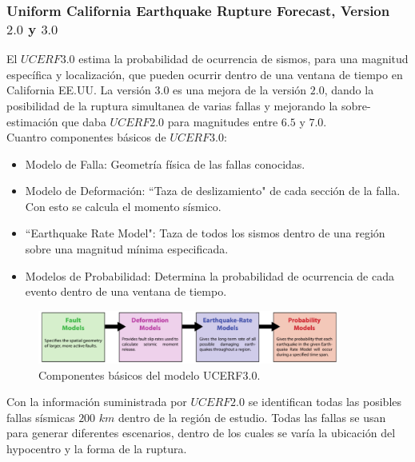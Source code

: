 %
%
\begin{frame}[allowframebreaks]
\frametitle{Uniform California Earthquake Rupture Forecast, Version $2.0$ y $3.0$}
%
\justifying
%
El $UCERF3.0$ estima la probabilidad de ocurrencia de sismos, para una magnitud específica y localización, que pueden ocurrir dentro de una ventana de tiempo en California EE.UU. La versión $3.0$ es una mejora de la versión $2.0$, dando la posibilidad de la ruptura simultanea de varias fallas y mejorando la sobre-estimación que daba $UCERF2.0$ para magnitudes entre $6.5$ y $7.0$.\\
%
Cuantro componentes básicos de $UCERF3.0$:
%
	\begin{itemize}
	\justifying
		\item Modelo de Falla: Geometría física de las fallas conocidas.
		\item Modelo de Deformación: ``Taza de deslizamiento" de cada sección de la falla. Con esto se calcula el momento sísmico.
		\item ``Earthquake Rate Model": Taza de todos los sismos dentro de una región sobre una magnitud mínima especificada.
		\item Modelos de Probabilidad: Determina la probabilidad de ocurrencia de cada evento dentro de una ventana de tiempo.
	\end{itemize}
%
\begin{figure}[h]
	\centering
	\includegraphics[height=1.75cm]{img/Components_UCERF.pdf}
	\caption{Componentes básicos del modelo UCERF3.0. \cite[figura 2, página 7]{ucerf3}}
\end{figure}
%
%
\justifying
Con la información suministrada por $UCERF2.0$ se identifican todas las posibles fallas sísmicas $200$ $km$ dentro de la región de estudio. Todas las fallas se usan para generar diferentes escenarios, dentro de los cuales se varía la ubicación del hypocentro y la forma de la ruptura.\\

\end{frame}
